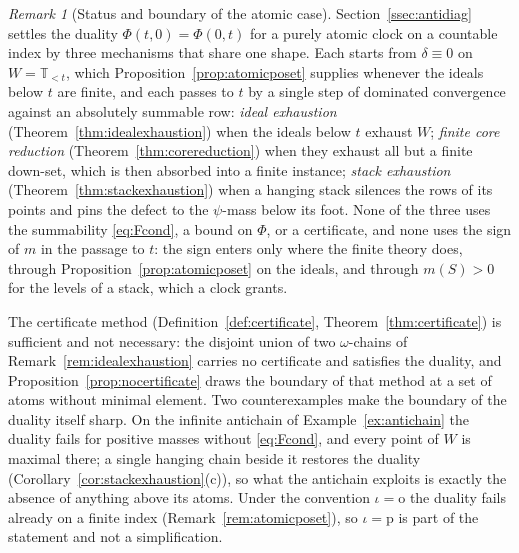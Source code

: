 \documentclass[11pt,a4paper]{article}
\theoremstyle{plain}
\theoremstyle{definition}
\theoremstyle{remark}
\newtheorem{remark}[theorem]{Remark}
\newcommand{\T}{\mathbb{T}}                     %
\begin{document}
\begin{remark}[Status and boundary of the atomic case]
  \label{rem:statusboundary}
  Section~\ref{ssec:antidiag} settles the duality $\Phi(t,0) = \Phi(0,t)$ for
  a purely atomic clock on a countable index by three mechanisms that share
  one shape.  Each starts from $\delta \equiv 0$ on $W = \T_{<t}$, which
  Proposition~\ref{prop:atomicposet} supplies whenever the ideals below $t$
  are finite, and each passes to $t$ by a single step of dominated
  convergence against an absolutely summable row: \emph{ideal exhaustion}
  (Theorem~\ref{thm:idealexhaustion}) when the ideals below $t$ exhaust $W$;
  \emph{finite core reduction} (Theorem~\ref{thm:corereduction}) when they
  exhaust all but a finite down-set, which is then absorbed into a finite
  instance; \emph{stack exhaustion} (Theorem~\ref{thm:stackexhaustion}) when
  a hanging stack silences the rows of its points and pins the defect to the
  $\psi$-mass below its foot.  None of the three uses the summability
  \eqref{eq:Fcond}, a bound on $\Phi$, or a certificate, and none uses the
  sign of $m$ in the passage to $t$: the sign enters only where the finite
  theory does, through Proposition~\ref{prop:atomicposet} on the ideals, and
  through $m(S) > 0$ for the levels of a stack, which a clock grants.

  The certificate method (Definition~\ref{def:certificate},
  Theorem~\ref{thm:certificate}) is sufficient and not necessary: the
  disjoint union of two $\omega$-chains of Remark~\ref{rem:idealexhaustion}
  carries no certificate and satisfies the duality, and
  Proposition~\ref{prop:nocertificate} draws the boundary of that method at a
  set of atoms without minimal element.  Two counterexamples make the
  boundary of the duality itself sharp.  On the infinite antichain of
  Example~\ref{ex:antichain} the duality fails for positive masses without
  \eqref{eq:Fcond}, and every point of $W$ is maximal there; a single hanging
  chain beside it restores the duality
  (Corollary~\ref{cor:stackexhaustion}(c)), so what the antichain exploits is
  exactly the absence of anything above its atoms.  Under the convention
  $\iota = \mathrm{o}$ the duality fails already on a finite index
  (Remark~\ref{rem:atomicposet}), so $\iota = \mathrm{p}$ is part of the
  statement and not a simplification.


\end{remark}
\end{document}
